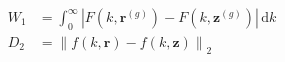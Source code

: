 \documentclass[12pt]{article}
\begin{document}
\begin{align*}
	W_1 &= \int_{0}^{\infty} \left| F\left(k,\mathbf{r}^{(g)}\right) - F\left(k,\mathbf{z}^{(g)}\right) \right| \, \mathrm{d}k \\[8pt]
	D_2 &= \left\| f(k,\mathbf{r}) - f(k,\mathbf{z}) \right\|_2
\end{align*}
\end{document}
